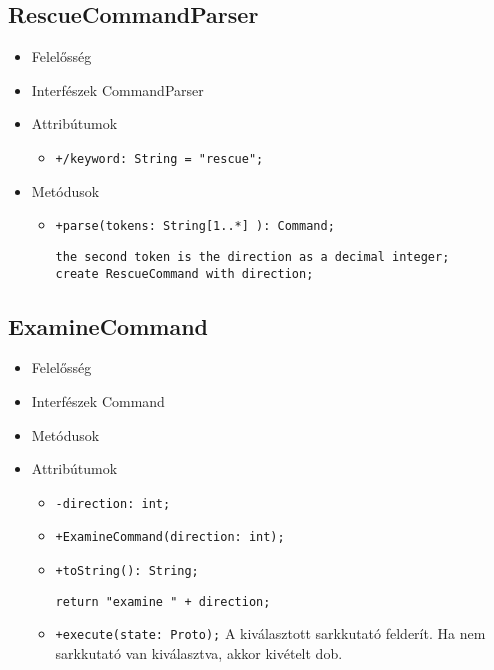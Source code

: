 \subsection{RescueCommandParser}
\begin{itemize}
\item Felelősség\newline
\item Interfészek\newline
CommandParser
\item Attribútumok
	\begin{itemize}
		\item \texttt{+/keyword: String = "rescue";}
	\end{itemize}
\item Metódusok
\begin{itemize}
		\item \texttt{+parse(tokens: String[1..*] ): Command;}
		\begin{lstlisting}
the second token is the direction as a decimal integer;
create RescueCommand with direction;
		\end{lstlisting}
	\end{itemize}
\end{itemize}

\subsection{ExamineCommand}
\begin{itemize}
\item Felelősség\newline
\item Interfészek\newline
Command
\item Metódusok
\item Attribútumok
	\begin{itemize}
		\item \texttt{-direction: int;}
	\end{itemize}
\begin{itemize}
		\item \texttt{+ExamineCommand(direction: int);}
		\item \texttt{+toString(): String;}
		\begin{lstlisting}
return "examine " + direction;
		\end{lstlisting}
		\item \texttt{+execute(state: Proto);} \newline
		A kiválasztott sarkkutató felderít. Ha nem sarkkutató van kiválasztva, akkor kivételt dob.
	\end{itemize}
\end{itemize}
